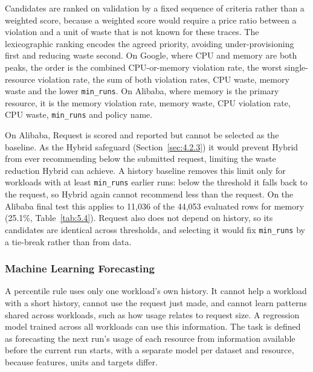 \documentclass{IEEEtran}
\begin{document}
Candidates are ranked on validation by a fixed sequence of criteria rather than a weighted score, because a weighted score would require a price ratio between a violation and a unit of waste that is not known for these traces. The lexicographic ranking encodes the agreed priority, avoiding under-provisioning first and reducing waste second. On Google, where CPU and memory are both peaks, the order is the combined CPU-or-memory violation rate, the worst single-resource violation rate, the sum of both violation rates, CPU waste, memory waste and the lower \texttt{min\_runs}. On Alibaba, where memory is the primary resource, it is the memory violation rate, memory waste, CPU violation rate, CPU waste, \texttt{min\_runs} and policy name.

On Alibaba, Request is scored and reported but cannot be selected as the baseline. As the Hybrid safeguard (Section~\ref{sec:4.2.3}) it would prevent Hybrid from ever recommending below the submitted request, limiting the waste reduction Hybrid can achieve. A history baseline removes this limit only for workloads with at least \texttt{min\_runs} earlier runs: below the threshold it falls back to the request, so Hybrid again cannot recommend less than the request. On the Alibaba final test this applies to 11,036 of the 44,053 evaluated rows for memory (25.1\%, Table~\ref{tab:5.4}). Request also does not depend on history, so its candidates are identical across thresholds, and selecting it would fix \texttt{min\_runs} by a tie-break rather than from data.

\subsubsection{Machine Learning Forecasting}\label{sec:4.2.2}

A percentile rule uses only one workload's own history. It cannot help a workload with a short history, cannot use the request just made, and cannot learn patterns shared across workloads, such as how usage relates to request size. A regression model trained across all workloads can use this information. The task is defined as forecasting the next run's usage of each resource from information available before the current run starts, with a separate model per dataset and resource, because features, units and targets differ.
\end{document}
